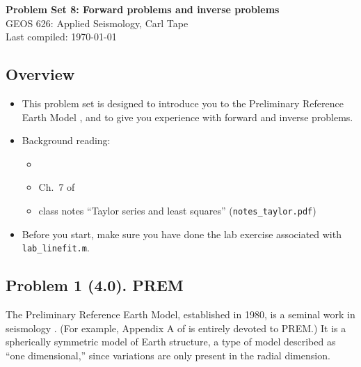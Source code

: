 \documentclass[11pt,titlepage,fleqn]{article}
\begin{document}

\begin{spacing}{1.2}
\centering
{\large \bf Problem Set 8: Forward problems and inverse problems} \\
GEOS 626: Applied Seismology, Carl Tape \\
Last compiled: \today
\end{spacing}


\subsection*{Overview}

\begin{itemize}
\item This problem set is designed to introduce you to the Preliminary Reference Earth Model \citep{PREM}, and to give you experience with forward and inverse problems.

\item Background reading:
%
\begin{itemize}
\item \citet{PREM}
\item Ch.~7 of \citet{SteinWysession}
\item class notes ``Taylor series and least squares'' (\verb+notes_taylor.pdf+)
\end{itemize}


\item Before you start, make sure you have done the lab exercise associated with \verb+lab_linefit.m+.

\end{itemize}


\subsection*{Problem 1 (4.0). PREM}

The Preliminary Reference Earth Model, established in 1980, is a seminal work in seismology \citep{PREM}. (For example, Appendix A of \citet{ShearerE2} is entirely devoted to PREM.) It is a spherically symmetric model of Earth structure, a type of model described as ``one dimensional,'' since variations are only present in the radial dimension.
\end{document}
